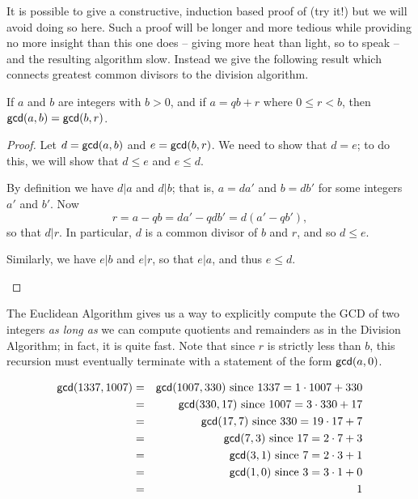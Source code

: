 It is possible to give a constructive, induction based proof of  (try it!) but we will avoid doing so here.
Such a proof will be longer and more tedious while providing no more insight than this one does -- giving more heat than light, so to speak -- and the resulting algorithm slow.
Instead we give the following result which connects greatest common divisors to the division algorithm.

\begin{prop}\label{prop:euclid-alg-zz}
If \(a\) and \(b\) are integers with \(b > 0\), and if \(a = qb + r\) where \(0 \leq r < b\), then \(\mathsf{gcd}(a, b) = \mathsf{gcd}(b, r)\).
\end{prop}

\begin{proof}
Let \(d = \mathsf{gcd}(a, b)\) and \(e = \mathsf{gcd}(b, r)\).
We need to show that \(d = e\); to do this, we will show that \(d \leq e\) and \(e \leq d\).
\begin{proplist}
\item By definition we have \(d|a\) and \(d|b\); that is, \(a = da'\) and \(b = db'\) for some integers \(a'\) and \(b'\).
Now \[ r = a - qb = da' - qdb' = d(a' - qb'), \] so that \(d|r\).
In particular, \(d\) is a common divisor of \(b\) and \(r\), and so \(d \leq e\).
\item Similarly, we have \(e|b\) and \(e|r\), so that \(e|a\), and thus \(e \leq d\).
\qedhere
\end{proplist}
\end{proof}

The Euclidean Algorithm gives us a way to explicitly compute the GCD of two integers \emph{as long as} we can compute quotients and remainders as in the Division Algorithm; in fact, it is quite fast.
Note that since \(r\) is strictly less than \(b\), this recursion must eventually terminate with a statement of the form \(\mathsf{gcd}(a, 0)\).

\begin{figure}[h]
\begin{eqnarray*}
\mathsf{gcd}(1337, 1007) & = & \mathsf{gcd}(1007, 330)\ \mathrm{since}\ 1337 = 1 \cdot 1007 + 330 \\
 & = & \mathsf{gcd}(330, 17)\ \mathrm{since}\ 1007 = 3 \cdot 330 + 17 \\
 & = & \mathsf{gcd}(17, 7)\ \mathrm{since}\ 330 = 19 \cdot 17 + 7 \\
 & = & \mathsf{gcd}(7, 3)\ \mathrm{since}\ 17 = 2 \cdot 7 + 3 \\
 & = & \mathsf{gcd}(3, 1)\ \mathrm{since}\ 7 = 2 \cdot 3 + 1 \\
 & = & \mathsf{gcd}(1, 0)\ \mathrm{since}\ 3 = 3 \cdot 1 + 0 \\
 & = & 1
\end{eqnarray*}
\caption{\label{fig:euclid-alg-example}}
\end{figure}

